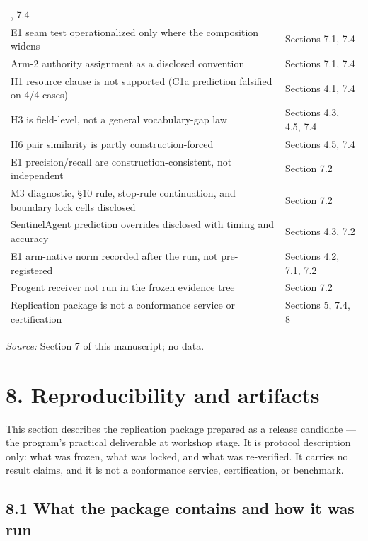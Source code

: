 \documentclass[
  10pt,
]{article}
\renewcommand{\_}{\allowbreak\origunderscore}
\begin{document}
{\begin{longtable}[]{@{}
  >{\raggedright\arraybackslash}p{}
  >{\raggedright\arraybackslash}p{}@{}}
7.2, 7.4 \\
E1 seam test operationalized only where the composition widens &
Sections 7.1, 7.4 \\
Arm-2 authority assignment as a disclosed convention & Sections 7.1,
7.4 \\
H1 resource clause is not supported (C1a prediction falsified on 4/4
cases) & Sections 4.1, 7.4 \\
H3 is field-level, not a general vocabulary-gap law & Sections 4.3, 4.5,
7.4 \\
H6 pair similarity is partly construction-forced & Sections 4.5, 7.4 \\
E1 precision/recall are construction-consistent, not independent &
Section 7.2 \\
M3 diagnostic, §10 rule, stop-rule continuation, and boundary lock cells
disclosed & Section 7.2 \\
SentinelAgent prediction overrides disclosed with timing and accuracy &
Sections 4.3, 7.2 \\
E1 arm-native norm recorded after the run, not pre-registered & Sections
4.2, 7.1, 7.2 \\
Progent receiver not run in the frozen evidence tree & Section 7.2 \\
Replication package is not a conformance service or certification &
Sections 5, 7.4, 8 \\
\end{longtable}
}

\emph{Source:} Section 7 of this manuscript; no data.

\section{8. Reproducibility and
artifacts}\label{reproducibility-and-artifacts}

This section describes the replication package prepared as a release
candidate --- the program's practical deliverable at workshop stage. It
is protocol description only: what was frozen, what was locked, and what
was re-verified. It carries no result claims, and it is not a
conformance service, certification, or benchmark.

\subsection{8.1 What the package contains and how it was
run}\label{what-the-package-contains-and-how-it-was-run}
\end{document}
